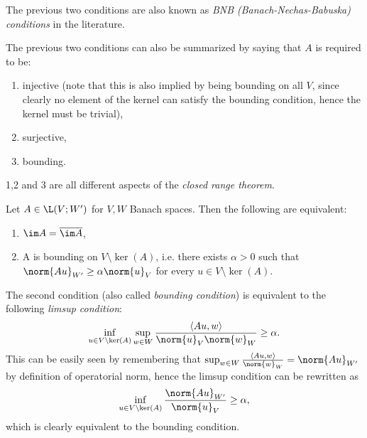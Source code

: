 The previous two conditions are also known as \emph{BNB (Banach-Nechas-Babuska) conditions} in the literature.
\begin{remark}
    The previous two conditions can also be summarized by saying that $A$ is required to be:
    \begin{enumerate}
        \item injective (note that this is also implied by being bounding on all $V$, since clearly no element of the kernel can satisfy the bounding condition, hence the kernel must be trivial),
        \item surjective,
        \item bounding.
    \end{enumerate}
    1,2 and 3 are all different aspects of the \emph{closed range theorem}.
\end{remark}
\begin{theorem}\label{theorem: closed range}
    Let $A\in\L(V;W')$ for $V,W$ Banach spaces. Then the following are equivalent:
    \begin{enumerate}
        \item $\im A = \overline{\im A}$,
        \item A is bounding on $V \setminus \ker(A)$, i.e. there exists $\alpha >0$ such that $\norm{Au}_{W'}\geq\alpha\norm{u}_V$ for every $u\in V\setminus\ker(A)$.
    \end{enumerate}
\end{theorem}
\begin{remark}
    The second condition (also called \emph{bounding condition}) is equivalent to the following \emph{limsup condition}:
    \begin{equation}\label{eqn:limsup condition}
        \inf_{u\in V\setminus\ker(A)}\sup_{w\in W}\frac{\langle Au,w \rangle}{\norm{u}_V\norm{w}_W}\geq\alpha.
    \end{equation}
    This can be easily seen by remembering that $\sup_{w\in W}\frac{\langle Au,w \rangle}{\norm{w}_W}=\norm{Au}_{W'}$ by definition of operatorial norm, hence the limsup condition can be rewritten as
    \begin{equation*}
        \inf_{u\in V\setminus\ker(A)}\frac{\norm{Au}_{W'}}{\norm{u}_V}\geq\alpha,
    \end{equation*}
    which is clearly equivalent to the bounding condition.
\end{remark}
